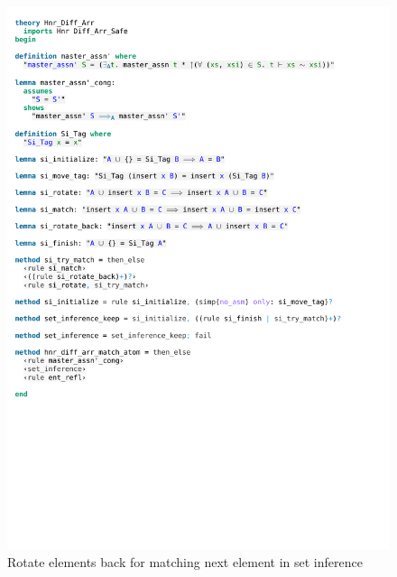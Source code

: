 \begin{figure}[htpb]
    \includegraphics[trim={0 17,4cm 0 11,8cm}, clip, width=1.00\textwidth]{figures/Theory_Hnr_Diff_Arr_SI.pdf}
    \caption[Rotate elements back for matching next element in set inference]{Rotate elements back for matching next element in set inference}
    \label{fig:si_rotate_back}
\end{figure}

